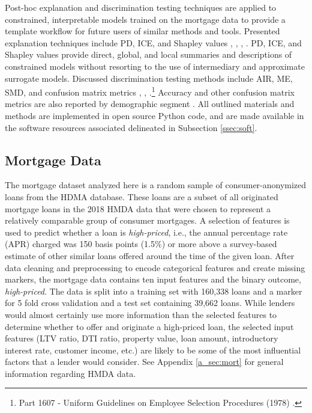 \documentclass[information,article,submit,moreauthors,pdftex]{definitions/mdpi}
\begin{document}
Post-hoc explanation and discrimination testing techniques are applied to constrained, interpretable models trained on the mortgage data to provide a template workflow for future users of similar methods and tools. Presented explanation techniques include PD, ICE, and Shapley values \cite{esl}, \cite{ice_plots}, \cite{shapley}, \cite{tree_shap}. PD, ICE, and Shapley values provide direct, global, and local summaries and descriptions of constrained models without resorting to the use of intermediary and approximate surrogate models. Discussed discrimination testing methods include AIR, ME, SMD, and confusion matrix metrics \cite{feldman2015certifying}, \cite{cohen1988statistical}, \cite{cohen1992power}.\footnote{Part 1607 - Uniform Guidelines on Employee Selection Procedures (1978) .} Accuracy and other confusion matrix metrics are also reported by demographic segment \cite{zafar2017fairness}. All outlined materials and methods are implemented in open source Python code, and are made available in the software resources associated delineated in Subsection \ref{ssec:soft}. 


\subsection{Mortgage Data}\label{ssec:mort_data}

The mortgage dataset analyzed here is a random sample of consumer-anonymized loans from the HDMA database. These loans are a subset of all originated mortgage loans in the 2018 HMDA data that were chosen to represent a relatively comparable group of consumer mortgages.  A selection of features is used to predict whether a loan is \textit{high-priced}, i.e., the annual percentage rate (APR) charged was 150 basis points (1.5\%) or more above a survey-based estimate of other similar loans offered around the time of the given loan.  After data cleaning and preprocessing to encode categorical features and create missing markers, the mortgage data contains ten input features and the binary outcome, \textit{high-priced}. The data is split into a training set with 160,338 loans and a marker for 5 fold cross validation and a test set containing 39,662 loans. While lenders would almost certainly use more information than the selected features to determine whether to offer and originate a high-priced loan, the selected input features (LTV ratio, DTI ratio, property value, loan amount, introductory interest rate, customer income, etc.) are likely to be some of the most influential factors that a lender would consider. See Appendix \ref{a_sec:mort} for general information regarding HMDA data.
\end{document}
